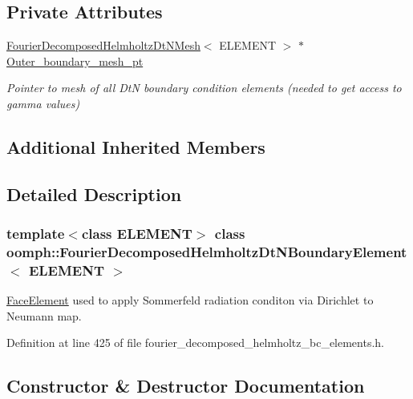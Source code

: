 \subsection*{Private Attributes}
\begin{DoxyCompactItemize}
\item 
\hyperlink{classoomph_1_1FourierDecomposedHelmholtzDtNMesh}{Fourier\+Decomposed\+Helmholtz\+Dt\+N\+Mesh}$<$ E\+L\+E\+M\+E\+NT $>$ $\ast$ \hyperlink{classoomph_1_1FourierDecomposedHelmholtzDtNBoundaryElement_ab09f70cbb3ec70075e9c25fee1b67fbd}{Outer\+\_\+boundary\+\_\+mesh\+\_\+pt}
\begin{DoxyCompactList}\small\item\em Pointer to mesh of all DtN boundary condition elements (needed to get access to gamma values) \end{DoxyCompactList}\end{DoxyCompactItemize}
\subsection*{Additional Inherited Members}


\subsection{Detailed Description}
\subsubsection*{template$<$class E\+L\+E\+M\+E\+NT$>$\newline
class oomph\+::\+Fourier\+Decomposed\+Helmholtz\+Dt\+N\+Boundary\+Element$<$ E\+L\+E\+M\+E\+N\+T $>$}

\hyperlink{classoomph_1_1FaceElement}{Face\+Element} used to apply Sommerfeld radiation conditon via Dirichlet to Neumann map. 

Definition at line 425 of file fourier\+\_\+decomposed\+\_\+helmholtz\+\_\+bc\+\_\+elements.\+h.



\subsection{Constructor \& Destructor Documentation}
\mbox{\label{classoomph_1_1FourierDecomposedHelmholtzDtNBoundaryElement_a248410954051f22d292126e70ca2f889}} 
